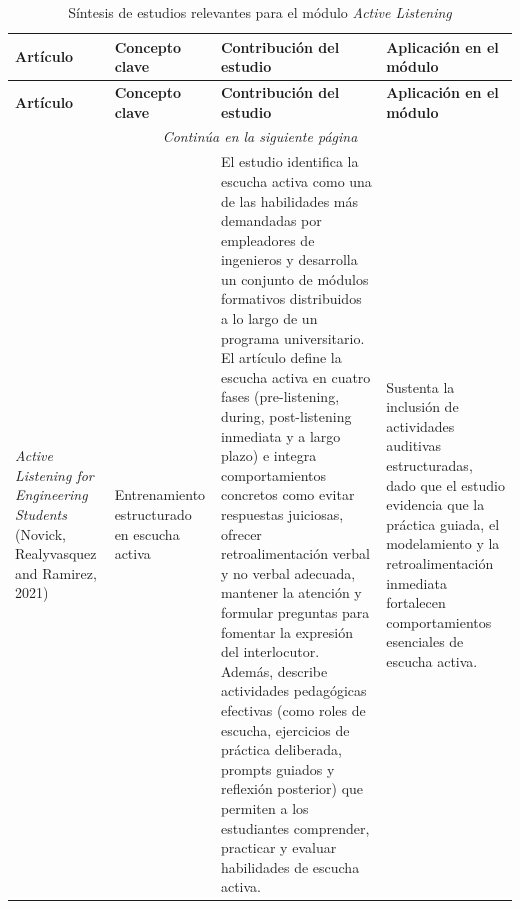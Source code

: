 \begin{center}
\footnotesize
\setlength{\tabcolsep}{3pt}
\renewcommand{\arraystretch}{1.2}

\begin{longtable}{| m{4.2cm} | m{3cm} | m{4.5cm} | m{4.5cm} |}
\caption{Síntesis de estudios relevantes para el módulo \textit{Active Listening}}
\label{tab:syntesis_active_listening} \\
\hline
\textbf{Artículo} & \textbf{Concepto clave} & \textbf{Contribución del estudio} & \textbf{Aplicación en el módulo} \\
\hline
\endfirsthead

\hline
\textbf{Artículo} & \textbf{Concepto clave} & \textbf{Contribución del estudio} & \textbf{Aplicación en el módulo} \\
\hline
\endhead

\hline \multicolumn{4}{c}{{\textit{Continúa en la siguiente página}}} \\
\endfoot

\hline
\endlastfoot

\textit{Active Listening for Engineering Students} (Novick, Realyvasquez and Ramirez, 2021) \cite{novick_2021_active_listening}  &
Entrenamiento estructurado en escucha activa &
El estudio identifica la escucha activa como una de las habilidades más demandadas por empleadores de ingenieros y desarrolla un conjunto de módulos formativos distribuidos a lo largo de un programa universitario. El artículo define la escucha activa en cuatro fases (pre-listening, during, post-listening inmediata y a largo plazo) e integra comportamientos concretos como evitar respuestas juiciosas, ofrecer retroalimentación verbal y no verbal adecuada, mantener la atención y formular preguntas para fomentar la expresión del interlocutor. Además, describe actividades pedagógicas efectivas (como roles de escucha, ejercicios de práctica deliberada, prompts guiados y reflexión posterior) que permiten a los estudiantes comprender, practicar y evaluar habilidades de escucha activa. &
Sustenta la inclusión de actividades auditivas estructuradas, dado que el estudio evidencia que la práctica guiada, el modelamiento y la retroalimentación inmediata fortalecen comportamientos esenciales de escucha activa. \\ \hline


\end{longtable}
\end{center}
